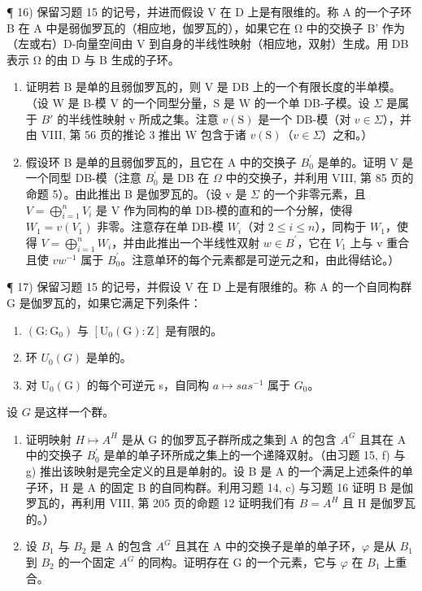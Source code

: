 ¶ 16) 保留习题 15 的记号，并进而假设 V 在 D 上是有限维的。称 A 的一个子环 B 在 A 中是弱伽罗瓦的（相应地，伽罗瓦的），如果它在 Ω 中的交换子 B' 作为（左或右）D-向量空间由 V 到自身的半线性映射（相应地，双射）生成。用 DB 表示 Ω 的由 D 与 B 生成的子环。

\begin{enumerate}
\def\labelenumi{\alph{enumi})}
\item
  证明若 B 是单的且弱伽罗瓦的，则 V 是 DB 上的一个有限长度的半单模。（设 W 是 B-模 V 的一个同型分量，S 是 W 的一个单 DB-子模。设 \(\Sigma\) 是属于 \(B'\) 的半线性映射 v 所成之集。注意 \(v(\mathrm{S})\) 是一个 DB-模（对 \(v \in \Sigma\)），并由 VIII, 第 56 页的推论 3 推出 W 包含于诸 \(v(\mathrm{S})\)（\(v \in \Sigma\)）之和。）
\item
  假设环 B 是单的且弱伽罗瓦的，且它在 A 中的交换子 \(B_{0}^{\prime}\) 是单的。证明 V 是一个同型 DB-模（注意 \(B_{0}^{\prime}\) 是 DB 在 \(\Omega\) 中的交换子，并利用 VIII, 第 85 页的命题 5）。由此推出 B 是伽罗瓦的。（设 v 是 \(\Sigma\) 的一个非零元素，且 \(V = \bigoplus_{i=1}^{n} V_{i}\) 是 V 作为同构的单 DB-模的直和的一个分解，使得 \(W_{1} = v(V_{1})\) 非零。注意存在单 DB-模 \(W_{i}\)（对 \(2 \leqslant i \leqslant n\)），同构于 \(W_{1}\)，使得 \(V = \bigoplus_{i=1}^{n} W_{i}\)，并由此推出一个半线性双射 \(w \in B^{\prime}\)，它在 \(V_{1}\) 上与 v 重合且使 \(vw^{-1}\) 属于 \(B_{0}^{\prime}\)。注意单环的每个元素都是可逆元之和，由此得结论。）
\end{enumerate}

¶ 17) 保留习题 15 的记号，并假设 V 在 D 上是有限维的。称 A 的一个自同构群 G 是伽罗瓦的，如果它满足下列条件：

\begin{enumerate}
\def\labelenumi{(\roman{enumi})}
\item
  \((\mathrm{G}:\mathrm{G}_{0})\) 与 \([\mathrm{U}_{0}(\mathrm{G}):\mathrm{Z}]\) 是有限的。
\item
  环 \(U_{0}(G)\) 是单的。
\item
  对 \(\mathrm{U}_{0}(\mathrm{G})\) 的每个可逆元 s，自同构 \(a \mapsto sas^{-1}\) 属于 \(G_{0}\)。
\end{enumerate}

设 \(G\) 是这样一个群。

\begin{enumerate}
\def\labelenumi{\alph{enumi})}
\item
  证明映射 \(H \mapsto A^{H}\) 是从 G 的伽罗瓦子群所成之集到 A 的包含 \(A^{G}\) 且其在 A 中的交换子 \(B_{0}^{\prime}\) 是单的单子环所成之集上的一个递降双射。（由习题 15, f) 与 g) 推出该映射是完全定义的且是单射的。设 B 是 A 的一个满足上述条件的单子环，H 是 A 的固定 B 的自同构群。利用习题 14, c) 与习题 16 证明 B 是伽罗瓦的，再利用 VIII, 第 205 页的命题 12 证明我们有 \(B = A^{H}\) 且 H 是伽罗瓦的。）
\item
  设 \(B_{1}\) 与 \(B_{2}\) 是 A 的包含 \(A^{G}\) 且其在 A 中的交换子是单的单子环，\(\varphi\) 是从 \(B_{1}\) 到 \(B_{2}\) 的一个固定 \(A^{G}\) 的同构。证明存在 G 的一个元素，它与 \(\varphi\) 在 \(B_{1}\) 上重合。
\end{enumerate}

